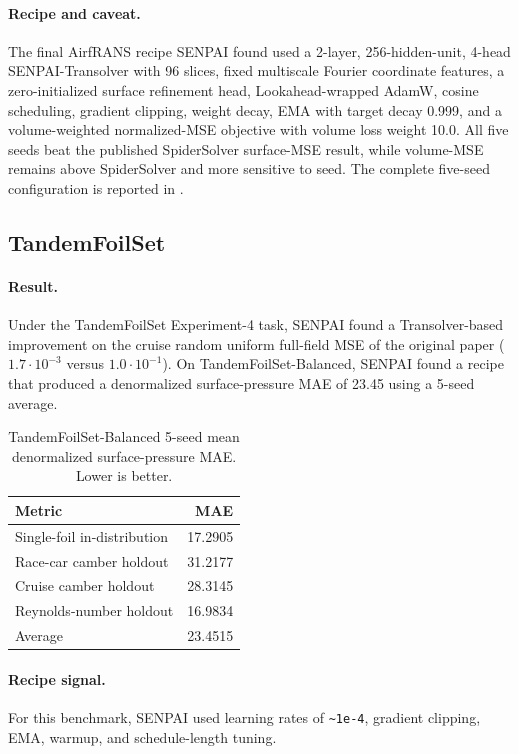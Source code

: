 \documentclass{article}
\begin{document}
\paragraph{Recipe and caveat.}
The final AirfRANS recipe SENPAI found used a 2-layer, 256-hidden-unit, 4-head SENPAI-Transolver with 96 slices, fixed multiscale Fourier coordinate features, a zero-initialized surface refinement head, Lookahead-wrapped AdamW, cosine scheduling, gradient clipping, weight decay, EMA with target decay 0.999, and a volume-weighted normalized-MSE objective with volume loss weight 10.0. All five seeds beat the published SpiderSolver surface-MSE result, while volume-MSE remains above SpiderSolver and more sensitive to seed. The complete five-seed configuration is reported in .

\subsection{TandemFoilSet}

\paragraph{Result.}
Under the TandemFoilSet Experiment-4 task, SENPAI found a Transolver-based improvement on the cruise random uniform full-field MSE of the original paper ($1.7\cdot 10^{-3}$ versus $1.0\cdot 10^{-1}$). On TandemFoilSet-Balanced, SENPAI found a recipe that produced a denormalized surface-pressure MAE of 23.45 using a 5-seed average.

\begin{table}[t]
  \caption{TandemFoilSet-Balanced 5-seed mean denormalized surface-pressure MAE. Lower is better.}
  \label{tab:tandem-balanced}
  \centering
  \small
  \begin{tabular}{@{}lr@{}}
    \toprule
    Metric & MAE \\
    \midrule
    Single-foil in-distribution & 17.2905 \\
    Race-car camber holdout & 31.2177 \\
    Cruise camber holdout & 28.3145 \\
    Reynolds-number holdout & 16.9834 \\
    Average & 23.4515 \\
    \bottomrule
  \end{tabular}
\end{table}

\paragraph{Recipe signal.}
For this benchmark, SENPAI used learning rates of \texttt{\textasciitilde1e-4}, gradient clipping, EMA, warmup, and schedule-length tuning.
\end{document}
